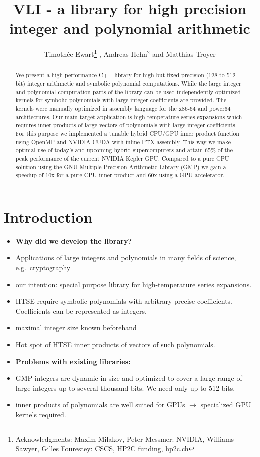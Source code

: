\documentclass[oribibl,a4paper]{llncs2e/llncs}
\title{VLI - a library for high precision integer and polynomial arithmetic}
\author{Timoth\'ee Ewart\inst{1}\thanks{Acknowledgments: Maxim Milakov, Peter Messmer:   NVIDIA,   Williams Sawyer, Gilles Fourestey:  CSCS, HP2C funding, hp2c.ch}  , Andreas Hehn$^2$ and Matthias Troyer\inst{2}}
\institute{Universit\'e de Gen\`eve, \email{timothee.ewart@gmail.com}  \and Eidgen\"ossische Technische Hochschule Z\"urich }
\begin{document}
\maketitle


\begin{abstract}
We present a high-performance C++ library for high but fixed precision
(128 to 512 bit) integer arithmetic and symbolic polynomial
computations. While the large integer and polynomial computation parts
of the library can be used independently optimized kernels for symbolic
polynomials with large integer coefficients are provided. The kernels
were manually optimized in assembly language for the x86-64 and power64
architectures. Our main target application is high-temperature series
expansions which requires inner products of large vectors of polynomials
with large integer coefficients. For this purpose we implemented a
tunable hybrid CPU/GPU inner product function using OpenMP and NVIDIA
CUDA with inline PTX assembly. This way we make optimal use of today's
and upcoming hybrid supercomputers and attain $65\%$ of the peak
performance of the current NVIDIA Kepler GPU. Compared to a pure CPU
solution using the GNU Multiple Precision Arithmetic Library (GMP) we
gain a speedup of 10x for a pure CPU inner product and 60x using a GPU
accelerator.
\end{abstract}

\section{Introduction}
\begin{itemize}
\item {\bf Why did we develop the library?}
\item Applications of large integers and polynomials in many fields of science, e.g.\ cryptography
\item our intention: special purpose library for high-temperature series expansions.
\item HTSE require symbolic polynomials with arbitrary precise coefficients. Coefficients can be represented as integers.
\item maximal integer size known beforehand
\item Hot spot of HTSE inner products of vectors of such polynomials.
\item {\bf Problems with existing libraries:}
\item GMP integers \cite{GMP} are dynamic in size and optimized to cover a large range of large integers up to several thousand bits. We need only up to 512 bits.
\item inner products of polynomials are well suited for GPUs $\rightarrow$ specialized GPU kernels required.
\end{itemize}
\end{document}
